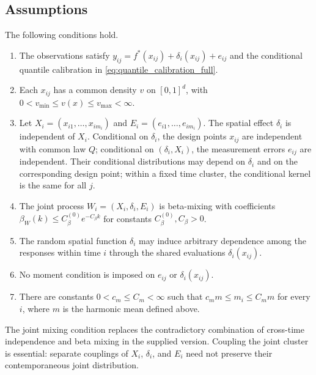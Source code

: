 \documentclass[twoside,11pt]{article}
\newenvironment{revision}{\color{revisionred}}{}
\begin{document}
\subsection{Assumptions}

\begin{assumption}\label{Assumption 1.}
\begin{revision}
The following conditions hold.
\begin{enumerate}
\item\label{ass_1_1__duplicate2} The observations satisfy
$y_{ij}=f^*(x_{ij})+\delta_i(x_{ij})+e_{ij}$ and the conditional quantile calibration in \eqref{eq:quantile_calibration_full}.
\item\label{ass_1_1_1} Each $x_{ij}$ has a common density $v$ on $[0,1]^d$, with $0<v_{\min}\le v(x)\le v_{\max}<\infty$.
\item\label{ass_1_2} Let $X_i=(x_{i1},\ldots,x_{im_i})$ and $E_i=(e_{i1},\ldots,e_{im_i})$. The spatial effect $\delta_i$ is independent of $X_i$. Conditional on $\delta_i$, the design points $x_{ij}$ are independent with common law $Q$; conditional on $(\delta_i,X_i)$, the measurement errors $e_{ij}$ are independent. Their conditional distributions may depend on $\delta_i$ and on the corresponding design point; within a fixed time cluster, the conditional kernel is the same for all $j$.
\item\label{ass_c_beta} The joint process $W_i=(X_i,\delta_i,E_i)$ is beta-mixing with coefficients
$\beta_W(k)\le C_\beta^{(0)}e^{-C_\beta k}$ for constants $C_\beta^{(0)},C_\beta>0$.
\item\label{ass_1_3} The random spatial function $\delta_i$ may induce arbitrary dependence among the responses within time $i$ through the shared evaluations $\delta_i(x_{ij})$.
\item\label{ass_1_4} No moment condition is imposed on $e_{ij}$ or $\delta_i(x_{ij})$.
\item\label{asm:m} There are constants $0<c_m\le C_m<\infty$ such that $c_mm\le m_i\le C_mm$ for every $i$, where $m$ is the harmonic mean defined above.
\end{enumerate}
\end{revision}
\end{assumption}

\begin{revision}
The joint mixing condition replaces the contradictory combination of cross-time independence and beta mixing in the supplied version. Coupling the joint cluster is essential: separate couplings of $X_i$, $\delta_i$, and $E_i$ need not preserve their contemporaneous joint distribution.
\end{revision}
\end{document}
